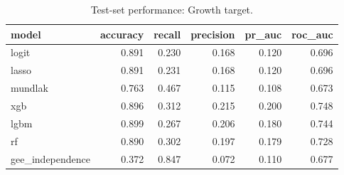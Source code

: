 \begin{table}
\caption{Test-set performance: Growth target.}
\label{tab:test_metrics_growth}
\begin{tabular}{lrrrrr}
\toprule
model & accuracy & recall & precision & pr_auc & roc_auc \\
\midrule
logit & 0.891 & 0.230 & 0.168 & 0.120 & 0.696 \\
lasso & 0.891 & 0.231 & 0.168 & 0.120 & 0.696 \\
mundlak & 0.763 & 0.467 & 0.115 & 0.108 & 0.673 \\
xgb & 0.896 & 0.312 & 0.215 & 0.200 & 0.748 \\
lgbm & 0.899 & 0.267 & 0.206 & 0.180 & 0.744 \\
rf & 0.890 & 0.302 & 0.197 & 0.179 & 0.728 \\
gee_independence & 0.372 & 0.847 & 0.072 & 0.110 & 0.677 \\
\bottomrule
\end{tabular}
\end{table}
